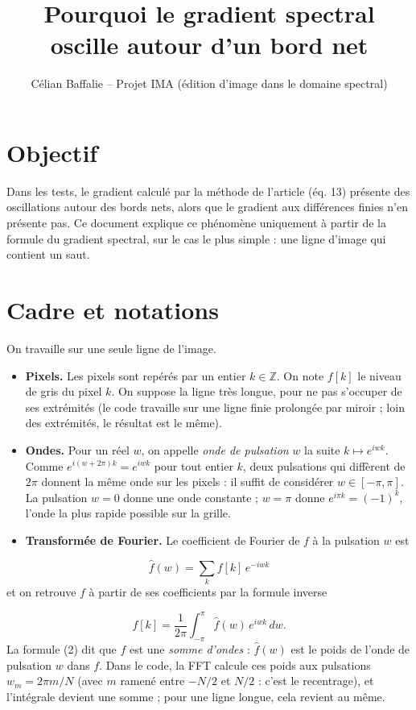 \documentclass[11pt,a4paper]{article}
\title{Pourquoi le gradient spectral oscille autour d'un bord net}
\author{Célian Baffalie -- Projet IMA (édition d'image dans le domaine spectral)}
\date{}
\begin{document}
\maketitle
\section*{Objectif}
Dans les tests, le gradient calculé par la méthode de l'article (éq. 13) présente des oscillations autour des bords nets, alors que le gradient aux différences finies n'en présente pas. Ce document explique ce phénomène uniquement à partir de la formule du gradient spectral, sur le cas le plus simple : une ligne d'image qui contient un saut.

\section*{Cadre et notations}
On travaille sur une seule ligne de l'image.

\begin{itemize}
\item \textbf{Pixels.} Les pixels sont repérés par un entier $k \in \mathbb{Z}$. On note $f[k]$ le niveau de gris du pixel $k$. On suppose la ligne très longue, pour ne pas s'occuper de ses extrémités (le code travaille sur une ligne finie prolongée par miroir ; loin des extrémités, le résultat est le même).
\item \textbf{Ondes.} Pour un réel $w$, on appelle \emph{onde de pulsation} $w$ la suite $k \mapsto e^{iwk}$. Comme $e^{i(w+2\pi)k} = e^{iwk}$ pour tout entier $k$, deux pulsations qui diffèrent de $2\pi$ donnent la même onde sur les pixels : il suffit de considérer $w \in [-\pi, \pi]$. La pulsation $w = 0$ donne une onde constante ; $w = \pi$ donne $e^{i\pi k} = (-1)^k$, l'onde la plus rapide possible sur la grille.
\item \textbf{Transformée de Fourier.} Le coefficient de Fourier de $f$ à la pulsation $w$ est
\end{itemize}
\begin{equation}
\hat{f}(w) = \sum_{k} f[k]\, e^{-iwk}
\end{equation}
et on retrouve $f$ à partir de ses coefficients par la formule inverse

\begin{equation}
f[k] = \frac{1}{2\pi} \int_{-\pi}^{\pi} \hat{f}(w)\, e^{iwk}\, dw .
\end{equation}
La formule (2) dit que $f$ est une \emph{somme d'ondes} : $\hat{f}(w)$ est le poids de l'onde de pulsation $w$ dans $f$. Dans le code, la FFT calcule ces poids aux pulsations $w_m = 2\pi m / N$ (avec $m$ ramené entre $-N/2$ et $N/2$ : c'est le recentrage), et l'intégrale devient une somme ; pour une ligne longue, cela revient au même.
\end{document}
